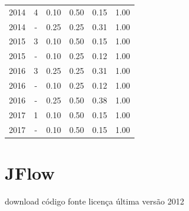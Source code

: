 \begin{table}[H]
\begin{tabular}{| l | c | c | c | c | c |}
\hline
            2014
          &
          4
          &
          0.10
          &
          0.50
          &
          0.15
          &
            {\color{blue} 1.00}
          \\
            2014
          &
          -
          &
          0.25
          &
          0.25
          &
          0.31
          &
            {\color{blue} 1.00}
          \\
\hline
            2015
          &
          3
          &
          0.10
          &
          0.50
          &
          0.15
          &
            {\color{blue} 1.00}
          \\
            2015
          &
          -
          &
          0.10
          &
          0.25
          &
          0.12
          &
            {\color{blue} 1.00}
          \\
\hline
            2016
          &
          3
          &
          0.25
          &
          0.25
          &
          0.31
          &
            {\color{blue} 1.00}
          \\
            2016
          &
          -
          &
          0.10
          &
          0.25
          &
          0.12
          &
            {\color{blue} 1.00}
          \\
            2016
          &
          -
          &
          0.25
          &
          0.50
          &
          0.38
          &
            {\color{blue} 1.00}
          \\
\hline
            2017
          &
          1
          &
          0.10
          &
          0.50
          &
          0.15
          &
            {\color{blue} 1.00}
          \\
            2017
          &
          -
          &
          0.10
          &
          0.50
          &
          0.15
          &
            {\color{blue} 1.00}
          \\
\hline
\end{tabular}
\end{table}



\section{JFlow}
\checkmark download
\checkmark código fonte
\checkmark licença
\checkmark última versão 2012


